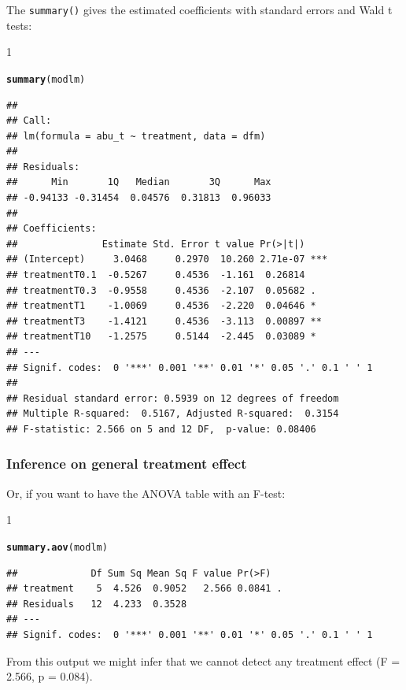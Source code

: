 \documentclass{scrartcl}\usepackage[]{graphicx}\usepackage[]{color}
\makeatletter
\newcommand{\hlstd}[1]{\textcolor[rgb]{0.345,0.345,0.345}{#1}}%
\newcommand{\hlkwd}[1]{\textcolor[rgb]{0.737,0.353,0.396}{\textbf{#1}}}%
\newenvironment{kframe}{%
 \def\at@end@of@kframe{}%
 \ifinner\ifhmode%
  \def\at@end@of@kframe{\end{minipage}}%
  \begin{minipage}{\columnwidth}%
 \fi\fi%
 \def\FrameCommand##1{\hskip\@totalleftmargin \hskip-\fboxsep
 \colorbox{shadecolor}{##1}\hskip-\fboxsep
     \hskip-\linewidth \hskip-\@totalleftmargin \hskip\columnwidth}%
 \MakeFramed {\advance\hsize-\width
   \@totalleftmargin\z@ \linewidth\hsize
   \@setminipage}}%
 {\par\unskip\endMakeFramed%
 \at@end@of@kframe}
\newenvironment{knitrout}{}{} %
\renewenvironment{knitrout}{\begin{spacing}{1}}{\end{spacing}}
\makeatother
\begin{document}
The \texttt{summary()} gives the estimated coefficients with standard errors and Wald t tests:
\begin{knitrout}
\color{fgcolor}\begin{kframe}
\begin{alltt}
\hlkwd{summary}\hlstd{(modlm)}
\end{alltt}
\begin{verbatim}
## 
## Call:
## lm(formula = abu_t ~ treatment, data = dfm)
## 
## Residuals:
##      Min       1Q   Median       3Q      Max 
## -0.94133 -0.31454  0.04576  0.31813  0.96033 
## 
## Coefficients:
##               Estimate Std. Error t value Pr(>|t|)    
## (Intercept)     3.0468     0.2970  10.260 2.71e-07 ***
## treatmentT0.1  -0.5267     0.4536  -1.161  0.26814    
## treatmentT0.3  -0.9558     0.4536  -2.107  0.05682 .  
## treatmentT1    -1.0069     0.4536  -2.220  0.04646 *  
## treatmentT3    -1.4121     0.4536  -3.113  0.00897 ** 
## treatmentT10   -1.2575     0.5144  -2.445  0.03089 *  
## ---
## Signif. codes:  0 '***' 0.001 '**' 0.01 '*' 0.05 '.' 0.1 ' ' 1
## 
## Residual standard error: 0.5939 on 12 degrees of freedom
## Multiple R-squared:  0.5167,	Adjusted R-squared:  0.3154 
## F-statistic: 2.566 on 5 and 12 DF,  p-value: 0.08406
\end{verbatim}
\end{kframe}
\end{knitrout}

\subsubsection{Inference on general treatment effect}
Or, if you want to have the ANOVA table with an F-test:
\begin{knitrout}
\color{fgcolor}\begin{kframe}
\begin{alltt}
\hlkwd{summary.aov}\hlstd{(modlm)}
\end{alltt}
\begin{verbatim}
##             Df Sum Sq Mean Sq F value Pr(>F)  
## treatment    5  4.526  0.9052   2.566 0.0841 .
## Residuals   12  4.233  0.3528                 
## ---
## Signif. codes:  0 '***' 0.001 '**' 0.01 '*' 0.05 '.' 0.1 ' ' 1
\end{verbatim}
\end{kframe}
\end{knitrout}

From this output we might infer that we cannot detect any treatment effect (F = 2.566, p = 0.084).
\end{document}

